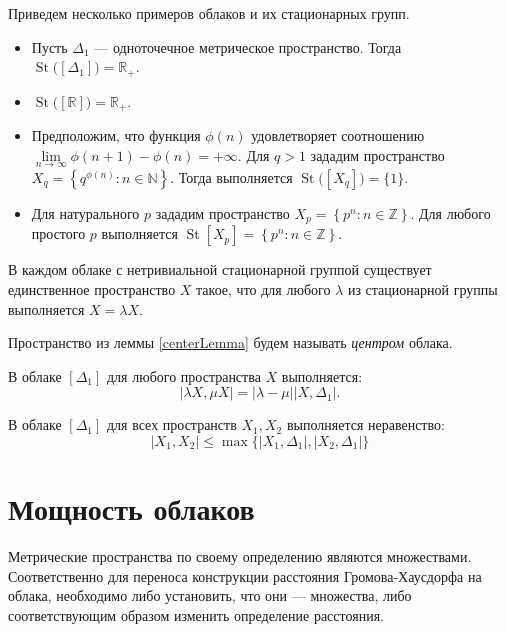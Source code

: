 \documentclass[11pt,twoside,draft
]{article}
\DeclareMathOperator{\St}{St}
\begin{document}
Приведем несколько примеров облаков и их стационарных групп.

\begin{itemize}
  \item Пусть $\Delta_1$ --- одноточечное метрическое
    пространство.  Тогда\\ $\St\bigl([\Delta_1]\bigr) = \mathbb{R}_+$.
  \item $\St\bigl([\mathbb{R}]\bigr) = \mathbb{R}_+ $.
  \item Предположим, что функция $\phi(n)$ удовлетворяет соотношению
    $\lim\limits_{n \rightarrow \infty } \phi(n + 1) - \phi(n) =
    +\infty$. Для $q > 1$ зададим пространство $X_q =
    \left\{q^{\phi(n)}: n \in \mathbb{N}\right\}$. Тогда выполняется
    $\St\bigl(\left[X_q\right]\bigr) = \{1\}$\cite{TuzhBog1}.
  \item Для натурального $p$ зададим пространство $X_p = \left\{p^n:n
    \in \mathbb{Z}\right\}$.
    Для любого простого $p$ выполняется $\St\left[X_p\right] =
    \left\{p^n:n \in \mathbb{Z}\right\}$\cite{BogBog1}.
\end{itemize}
\begin{lemma}
  В каждом облаке с нетривиальной стационарной группой существует единственное
  пространство $X$ такое, что для любого $\lambda$ из стационарной группы
  выполняется $X = \lambda X$.
  \label{centerLemma}
\end{lemma}
\begin{defin}
  Пространство из леммы \ref{centerLemma} будем называть \emph{центром} облака.
\end{defin}
\begin{remark} В
  облаке $[\Delta_1]$ для любого пространства $X$ выполняется:
  $$|\lambda X, \mu X| = |\lambda - \mu||X,\Delta_1|.$$
\end{remark}
\begin{remark} В облаке
  $[\Delta_{1}]$ для всех пространств $X_{1}, X_{2}$ выполняется неравенство:
  $$|X_{1},X_{2}| \le \max\{|X_{1}, \Delta_{1}|,|X_{2},\Delta_{1}|\}$$
  \label{remUltraMetric}
\end{remark}

\section{Мощность облаков}
Метрические пространства по своему определению являются множествами.
Соответственно для переноса конструкции расстояния Громова-Хаусдорфа на облака,
необходимо либо установить, что они --- множества, либо соответствующим
образом изменить определение расстояния.
\end{document}
